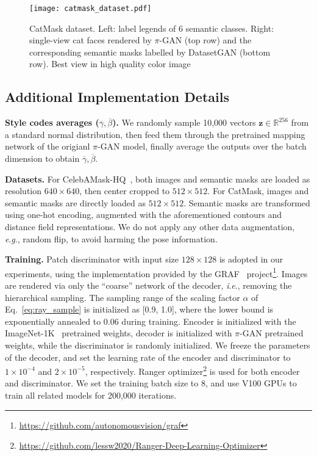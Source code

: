 \documentclass[runningheads]{llncs}
\newcommand{\ie}{\textit{i}.\textit{e}.}
\newcommand{\eg}{\textit{e}.\textit{g}.}
\begin{document}
\begin{figure}[t!]
    \centering
    \texttt{[image: catmask\_dataset.pdf]}
\caption{CatMask dataset. Left: label legends of 6 semantic classes. Right: single-view cat faces rendered by $\pi$-GAN (top row) and the corresponding semantic masks labelled by DatasetGAN (bottom row). Best view in high quality color image}
\label{fig:catmask_dataset}
\end{figure}


\subsection{Additional Implementation Details} \label{sec:tech_imple}

\textbf{Style codes averages ($\overline{\gamma}, \overline{\beta}$).} We randomly sample 10,000 vectors $\mathbf{z}\in\mathbb{R}^{256}$ from a standard normal distribution, then feed them through the pretrained mapping network of the origianl $\pi$-GAN model, finally average the outputs over the batch dimension to obtain $\overline{\gamma}, \overline{\beta}$.

\textbf{Datasets.} For CelebAMask-HQ~\cite{lee2020maskgan}, both images and semantic masks are loaded as resolution $640\times640$, then center cropped to $512\times512$. For CatMask, images and semantic masks are directly loaded as $512\times512$. Semantic masks are transformed using one-hot encoding, augmented with the aforementioned contours and distance field representations. We do not apply any other data augmentation, \eg, random flip, to avoid harming the pose information.

\textbf{Training.} Patch discriminator with input size $128\times128$ is adopted in our experiments, using the implementation provided by the GRAF~\cite{schwarz2020graf} project\footnote{\url{https://github.com/autonomousvision/graf}}. Images are rendered via only the ``coarse'' network of the decoder, \ie, removing the hierarchical sampling. The sampling range of the scaling factor $\alpha$ of Eq.~\eqref{eq:ray_sample} is initialized as [0.9, 1.0], where the lower bound is exponentially annealed to 0.06 during training. Encoder is initialized with the ImageNet-1K~\cite{deng2009imagenet} pretrained weights, decoder is initialized with $\pi$-GAN pretrained weights, while the discriminator is randomly initialized.
We freeze the parameters of the decoder, and set the learning rate of the encoder and discriminator to $1\times10^{-4}$ and $2\times10^{-5}$, respectively. Ranger optimizer\footnote{\url{https://github.com/lessw2020/Ranger-Deep-Learning-Optimizer}} is used for both encoder and discriminator. We set the training batch size to 8, and use V100 GPUs to train all related models for 200,000 iterations.
\end{document}
